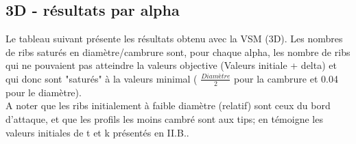 \subsection{3D - résultats par alpha}

Le tableau suivant présente les résultats obtenu avec la VSM (3D). Les nombres de ribs saturés en diamètre/cambrure sont, pour chaque alpha, les nombre de ribs qui ne pouvaient pas atteindre la valeurs objective (Valeurs initiale + delta) et qui donc sont "saturés" à la valeurs minimal ( $\frac{Diamètre}{2}$ pour la cambrure et 0.04 pour le diamètre).\\

A noter que les ribs initialement à faible diamètre (relatif) sont ceux du bord d'attaque, et que les profils les moins cambré sont aux tips; en témoigne les valeurs initiales de t et k présentés en II.B..

